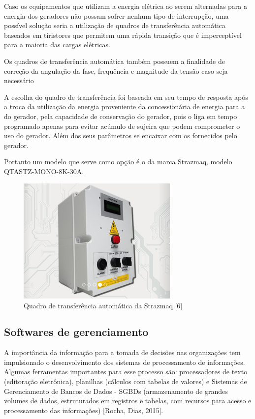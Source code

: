 Caso os equipamentos que utilizam a energia elétrica ao serem alternadas para a energia dos geradores não possam sofrer nenhum tipo de interrupção, uma possível solução seria a utilização de quadros de transferência automática baseados em tiristores que permitem uma rápida transição que é imperceptível para a maioria das cargas elétricas. 

Os quadros de transferência automática também possuem a finalidade de correção da angulação da fase, frequência e magnitude da tensão caso seja necessário

A escolha do quadro de transferência foi baseada em seu tempo de resposta após a troca da utilização da energia proveniente da concessionária de energia para a do gerador, pela capacidade de conservação do gerador, pois o liga em tempo programado apenas para evitar acúmulo de sujeira que podem comprometer o uso do gerador. Além dos seus parâmetros se encaixar com os fornecidos pelo gerador.

Portanto um modelo que serve como opção é o da marca Strazmaq, modelo QTASTZ-MONO-8K-30A.
\begin{figure}[!h]
	\centering
	\includegraphics[width=0.7\textwidth]{figuras/quadroStrazmaq.png}
	\caption{Quadro de transferência automática da Strazmaq [6]}
	\label{fig:geradorbat}
\end{figure}

\subsection{Softwares de gerenciamento}
A importância da informação para a tomada de decisões nas organizações tem impulsionado o desenvolvimento dos sistemas de processamento de informações. Algumas ferramentas importantes para esse processo são: processadores de texto (editoração eletrônica), planilhas (cálculos com tabelas de valores) e Sistemas de Gerenciamento de Bancos de Dados - SGBDs (armazenamento de grandes volumes de dados, estruturados em registros e tabelas, com recursos para acesso e processamento das informações) [Rocha, Dias, 2015].

